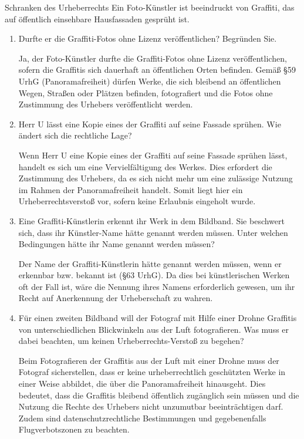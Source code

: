 \documentclass{article}
\begin{document}
\begin{exercise}{Schranken des Urheberrechts}
  Ein Foto-Künstler ist beeindruckt von Graffiti, das auf öffentlich einsehbare Hausfassaden gesprüht ist.
  \begin{enumerate}
    \item Durfte er die Graffiti-Fotos ohne Lizenz veröffentlichen? Begründen Sie.

          \begin{solution}
            Ja, der Foto-Künstler durfte die Graffiti-Fotos ohne Lizenz veröffentlichen, sofern die Graffitis sich dauerhaft an öffentlichen Orten befinden. Gemäß §59 UrhG (Panoramafreiheit) dürfen Werke, die sich bleibend an öffentlichen Wegen, Straßen oder Plätzen befinden, fotografiert und die Fotos ohne Zustimmung des Urhebers veröffentlicht werden.
          \end{solution}
    \item Herr U lässt eine Kopie eines der Graffiti auf seine Fassade sprühen. Wie ändert sich die rechtliche Lage?

          \begin{solution}
            Wenn Herr U eine Kopie eines der Graffiti auf seine Fassade sprühen lässt, handelt es sich um eine Vervielfältigung des Werkes. Dies erfordert die Zustimmung des Urhebers, da es sich nicht mehr um eine zulässige Nutzung im Rahmen der Panoramafreiheit handelt. Somit liegt hier ein Urheberrechtsverstoß vor, sofern keine Erlaubnis eingeholt wurde.
          \end{solution}
    \item Eine Graffiti-Künstlerin erkennt ihr Werk in dem Bildband. Sie beschwert sich, dass ihr Künstler-Name hätte genannt werden müssen. Unter welchen Bedingungen hätte ihr Name genannt werden müssen?

          \begin{solution}
            Der Name der Graffiti-Künstlerin hätte genannt werden müssen, wenn er erkennbar bzw. bekannt ist (§63 UrhG). Da dies bei künstlerischen Werken oft der Fall ist, wäre die Nennung ihres Namens erforderlich gewesen, um ihr Recht auf Anerkennung der Urheberschaft zu wahren.
          \end{solution}
    \item Für einen zweiten Bildband will der Fotograf mit Hilfe einer Drohne Graffitis von unterschiedlichen Blickwinkeln aus der Luft fotografieren. Was muss er dabei beachten, um keinen Urheberrechts-Verstoß zu begehen?

          \begin{solution}
            Beim Fotografieren der Graffitis aus der Luft mit einer Drohne muss der Fotograf sicherstellen, dass er keine urheberrechtlich geschützten Werke in einer Weise abbildet, die über die Panoramafreiheit hinausgeht. Dies bedeutet, dass die Graffitis bleibend öffentlich zugänglich sein müssen und die Nutzung die Rechte des Urhebers nicht unzumutbar beeinträchtigen darf. Zudem sind datenschutzrechtliche Bestimmungen und gegebenenfalls Flugverbotszonen zu beachten.
          \end{solution}
  \end{enumerate}
\end{exercise}
\end{document}
